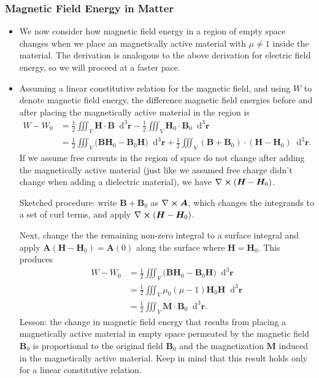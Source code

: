 \documentclass[11pt, a4paper]{article}
\newcommand{\diff}{\mathop{}\!\mathrm{d}} %
\newcommand{\dr}{\diff^{3} \r}  %
\renewcommand{\vec}[1]{\bm{#1}} %
\renewcommand{\r}{\vec{r}}
\newcommand{\B}{\vec{B}} %
\renewcommand{\H}{\vec{H}}  %
\newcommand{\A}{\vec{A}} %
\newcommand{\M}{\vec{M}}  %
\newcommand{\mm}{\mu_{0}}  %
\renewcommand{\curl}{\nabla \cross}
\begin{document}
\subsubsection{Magnetic Field Energy in Matter}
\begin{itemize}
	\item We now consider how magnetic field energy in a region of empty space changes when we place an magnetically active material with $ \mu \neq 1 $ inside the material. The derivation is analogous to the above derivation for electric field energy, so we will proceed at a faster pace.
	
	\item Assuming a linear constitutive relation for the magnetic field, and using $ W $ to denote magnetic field energy, the difference magnetic field energies before and after placing the magnetically active material in the region is
	\begin{align*}
		W - W_{0} &= \frac{1}{2} \iiint_{V} \H \cdot \B  \dr - \frac{1}{2}\iiint_{V}\H_{0}\cdot\B_{0}\dr\\
		& = \frac{1}{2}\iiint_{V}\big(\B \H_{0} - \B_{0}\H\big)\dr + \frac{1}{2}\iiint_{V}(\B + \B_{0})\cdot(\H - \H_{0}) \dr.
	\end{align*}
    If we assume free currents in the region of space do not change after adding the magnetically active material (just like we assumed free charge didn't change when adding a dielectric material), we have $ \curl (\H - \H_{0}) $. 

    Sketched procedure: write $ \B + \B_{0} $ as $ \curl \A $, which changes the integrands to a set of curl terms, and apply  $ \curl (\H - \H_{0})  $. 

    Next, change the the remaining non-zero integral to a surface integral and apply $ \A(\H - \H_{0}) = \A(0) $ along the surface where $ \H = \H_{0} $. This produces
	\begin{align*}
		W - W_{0} &= \frac{1}{2}\iiint_{V}\big(\B \H_{0} - \B_{0}\H\big)\dr \\
        & = \frac{1}{2} \iiint_{V}\mm (\mu - 1)\H_{0}\H\dr\\
		& = \frac{1}{2}\iiint_{V}\M \cdot \B_{0}\dr.
	\end{align*}
	Lesson: the change in magnetic field energy that results from placing a magnetically active material in empty space permeated by the magnetic field $ \B_{0} $ is proportional to the original field $ \B_{0} $ and the magnetization $ \M $ induced in the magnetically active material. Keep in mind that this result holds only for a linear constitutive relation.
\end{itemize}
\end{document}
